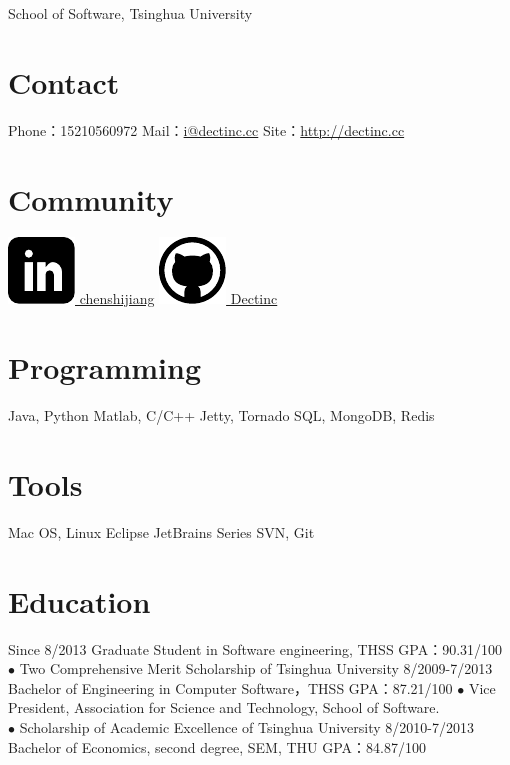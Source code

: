 \documentclass[]{friggeri-cv}
\begin{document}
       {School of Software, Tsinghua University}

\begin{aside}
  \section{Contact}
    Phone：15210560972
    Mail：\href{mailto:i@dectinc.cc}{i@dectinc.cc}
    Site：\href{http://dectinc.cc}{http://dectinc.cc}
  \section{Community}
    \href{http://www.linkedin.com/in/chenshijiang}{\includegraphics[width=.8em]{icons/linkedin.pdf} chenshijiang}
    \href{https://github.com/Dectinc}{\includegraphics[width=.9em]{icons/github.pdf} Dectinc}
  \section{Programming}
    Java, Python
    Matlab, C/C++
    Jetty, Tornado
    SQL, MongoDB, Redis
  \section{Tools}
    Mac OS, Linux
    Eclipse
    JetBrains Series
    SVN, Git
\end{aside}



\section{Education}

\begin{entrylist}
  \entry
    {Since 8/2013}
    {Graduate Student in Software engineering, THSS}
    {GPA：90.31/100}
    {
    $\bullet$ Two Comprehensive Merit Scholarship of Tsinghua University
    }
  \entry
    {8/2009-7/2013}
    {Bachelor of Engineering in Computer Software，THSS}
    {GPA：87.21/100}
    {
    $\bullet$ Vice President, Association for Science and Technology, School of Software.\\
    $\bullet$ Scholarship of Academic Excellence of Tsinghua University 
    }
  \entry
    {8/2010-7/2013}
    {Bachelor of Economics, second degree, SEM, THU}
    {GPA：84.87/100}
    {}
\end{entrylist}
\end{document}
